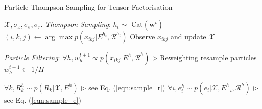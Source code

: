 %

\begin{algorithm}[t!]
   \caption{Particle Thompson Sampling for Tensor Factorisation}
   \label{alg:smc}
\begin{algorithmic}
    $\mathcal{X}, \sigma_x, \sigma_e, \sigma_r$.
   \STATE \textit{Thompson Sampling}:
   \STATE $h_t \sim $ Cat$(\mathbf{w}^{t})$
   \STATE $(i,k,j) \leftarrow \arg\max p(x_{ikj}| E^{h_t}, \mathcal{R}^{h_t})$
   \STATE Observe $x_{ikj}$ and update $\mathcal{X}$

   \STATE \textit{Particle Filtering}:
   \STATE $\forall h, w_h^{t+1} \propto p(x_{ikj} | E^{h}, \mathcal{R}^{h})$   \hfill $\triangleright$ Reweighting
   \STATE resample particles
   \STATE $w_h^{t+1} \leftarrow 1/H$
   \ENDIF

   \STATE $\forall k, R_k^{h} \sim p(R_k | \mathcal{X}, E^{h})$   \hfill $\triangleright$ see Eq. (\ref{eqn:sample_r})
   \STATE $\forall i, e^{h}_i \sim p(e_i | \mathcal{X}, E^{h}_{-i}, \mathcal{R}^{h})$ \hfill $\triangleright$ see Eq. (\ref{eqn:sample_e})
   \ENDFOR

   \ENDFOR
\end{algorithmic}
\end{algorithm}

